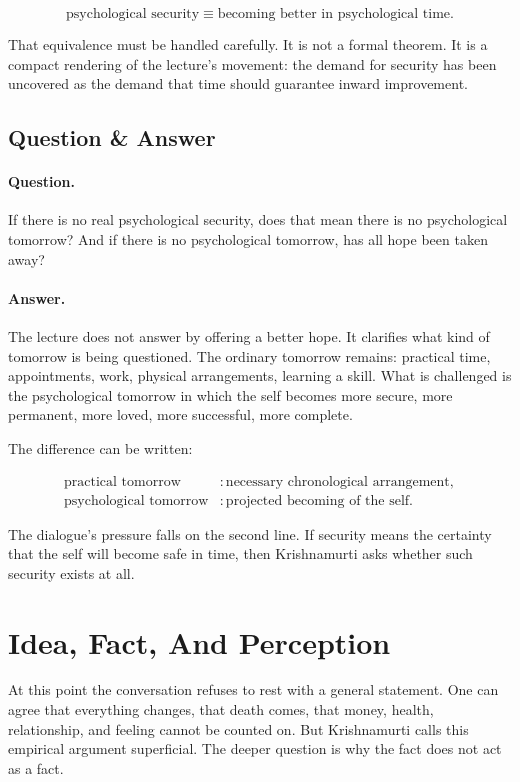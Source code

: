 \begin{equation}
\text{psychological security}
\equiv
\text{becoming better in psychological time}.
\end{equation}

That equivalence must be handled carefully. It is not a formal theorem. It is a compact rendering of the lecture's movement: the demand for security has been uncovered as the demand that time should guarantee inward improvement.

\subsection{Question \& Answer}

\paragraph{Question.}
If there is no real psychological security, does that mean there is no psychological tomorrow? And if there is no psychological tomorrow, has all hope been taken away?

\paragraph{Answer.}
The lecture does not answer by offering a better hope. It clarifies what kind of tomorrow is being questioned. The ordinary tomorrow remains: practical time, appointments, work, physical arrangements, learning a skill. What is challenged is the psychological tomorrow in which the self becomes more secure, more permanent, more loved, more successful, more complete.

The difference can be written:

\begin{align}
\text{practical tomorrow} &: \text{necessary chronological arrangement}, \\
\text{psychological tomorrow} &: \text{projected becoming of the self}.
\end{align}

The dialogue's pressure falls on the second line. If security means the certainty that the self will become safe in time, then Krishnamurti asks whether such security exists at all.

\section{Idea, Fact, And Perception}

At this point the conversation refuses to rest with a general statement. One can agree that everything changes, that death comes, that money, health, relationship, and feeling cannot be counted on. But Krishnamurti calls this empirical argument superficial. The deeper question is why the fact does not act as a fact.


